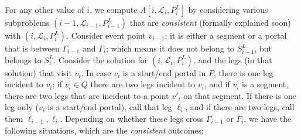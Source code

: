 \documentclass[pdflatex,sn-mathphys-num]{sn-jnl}
\theoremstyle{thmstyleone}
\begin{document}
For any other value of $i$, we compute $A[i,\mathcal L_i,P^L_i]$ by considering various subproblems 
$(i-1,\mathcal L_{i-1},P^L_{i-1})$ that are {\em consistent} (formally explained soon) with $(i,\mathcal L_{i},P^L_{i})$.
Consider event point $v_{i-1}$; it is either a segment or a portal that is between $\Gamma_{i-1}$ and $\Gamma_i$; which  means it does not belong to $S^L_{i-1}$, but belongs to $S^L_i$. Consider the solution for $(i,\mathcal L_i,P^L_i)$, and the legs (in that solution) that visit $v_i$. In case $v_i$ is a start/end
portal in $P$, there is one leg incident to $v_i$; if $v_i\in Q$ there are two legs incident to $v_i$, and
if $v_i$ is a segment, there are two legs that are incident to a point $v'_i$ on that segment. 
If there is one leg only ($v_i$ is a start/end portal), call that leg $\ell_i$, and if there are two legs, call them $\ell_{i-1},\ell_i$. Depending on whether these legs cross $\Gamma_{i-1}$ or $\Gamma_i$, we have the following situations, which are the {\em consistent} outcomes:
\end{document}
